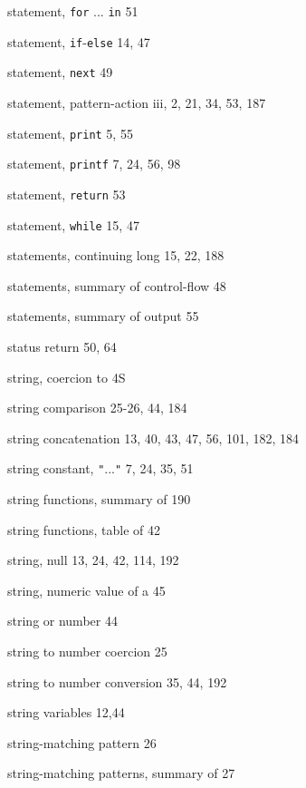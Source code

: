 \begin{multicols}{3}
\hangindent=3pc  statement, \verb'for' ... \verb'in' 51

\hangindent=3pc  statement, \verb'if'-\verb'else' 14, 47

\hangindent=3pc  statement, \verb'next' 49

\hangindent=3pc  statement, pattern-action iii, 2, 21, 34, 53, 187

\hangindent=3pc  statement, \verb'print' 5, 55

\hangindent=3pc  statement, \verb'printf' 7, 24, 56, 98

\hangindent=3pc  statement, \verb'return' 53

\hangindent=3pc  statement, \verb'while' 15, 47

\hangindent=3pc  statements, continuing long 15, 22, 188

\hangindent=3pc  statements, summary of control-flow 48

\hangindent=3pc  statements, summary of output 55

\hangindent=3pc  status return 50, 64

\hangindent=3pc  string, coercion to 4S

\hangindent=3pc  string comparison 25-26, 44, 184

\hangindent=3pc  string concatenation 13, 40, 43,  47, 56, 101, 182, 184

\hangindent=3pc  string constant, \verb'"'...\verb'"' 7, 24, 35, 51

\hangindent=3pc  string functions, summary of 190

\hangindent=3pc  string functions, table of 42

\hangindent=3pc  string, null 13, 24, 42, 114, 192

\hangindent=3pc  string, numeric value of a 45

\hangindent=3pc  string or number 44

\hangindent=3pc  string to number coercion 25

\hangindent=3pc  string to number conversion 35, 44, 192

\hangindent=3pc  string variables 12,44

\hangindent=3pc  string-matching pattern 26

\hangindent=3pc  string-matching patterns, summary of 27


\end{multicols}
